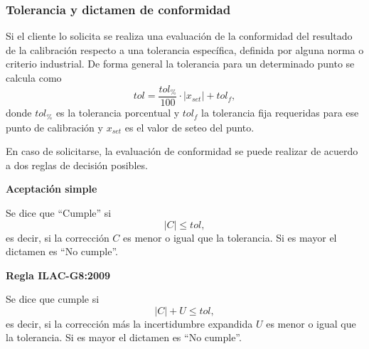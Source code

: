 \subsubsection{Tolerancia y dictamen de conformidad}\label{sec:dictamen-conformidad}

Si el cliente lo solicita se realiza una evaluación de la conformidad del resultado de la calibración respecto a una tolerancia específica, definida por alguna norma o criterio industrial. De forma general la tolerancia para un determinado punto se calcula como
\begin{equation}
    tol = \frac{tol_{\textit{\%}}}{100}\cdot|x_{set}| + tol_{\textit{f}},
\end{equation}
donde $tol_{\textit{\%}}$ es la tolerancia porcentual y $tol_{\textit{f}}$ la tolerancia fija requeridas para ese punto de calibración y $x_{set}$ es el valor de seteo del punto.

En caso de solicitarse, la evaluación de conformidad se puede realizar de acuerdo a dos reglas de decisión posibles. 

\textbf{Aceptación simple}

Se dice que ``Cumple'' si
\begin{equation*}
    |C| \leq tol,    
\end{equation*} 
es decir, si la corrección $C$ es menor o igual que la tolerancia. Si es mayor el dictamen es  ``No cumple''.

\textbf{Regla ILAC-G8:2009}

Se dice que cumple si
\begin{equation*}
    |C| + U \leq tol, 
\end{equation*}
es decir, si la corrección más la incertidumbre expandida $U$ es menor o igual que la tolerancia. Si es mayor el dictamen es ``No cumple''.